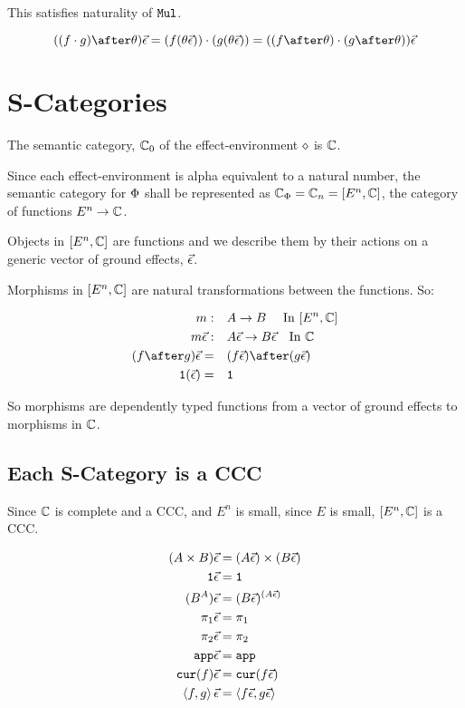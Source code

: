 \documentclass{report}
\begin{document}
This satisfies naturality of $\Mul$.

\begin{equation}
    ((f\dot g)\after \theta)\ev = (f(\theta\ev))\dot(g(\theta\ev)) = ((f\after\theta)\dot(g\after\theta))\ev
\end{equation}

\section{S-Categories}
The semantic category, $\C_0$ of the effect-environment $\nil$ is $\C$.

Since each effect-environment is alpha equivalent to a natural number, the semantic category for $\P$ shall be represented as $\C_{\P} = \C_n = [E^n, \C]$, the category of functions $E^n\rightarrow \C$.

Objects in $[E^n, \C]$ are functions and we describe them by their actions on a generic vector of ground effects, $\ev$.

Morphisms in $[E^n, \C]$ are natural transformations between the functions. So:

\begin{align}
    m:\quad&A \rightarrow B \qt{ In $[E^n, \C]$}\\
    m\ev:\quad& A\ev \rightarrow B\ev \qt{In $\C$}\\
    (f\after g)\ev =\quad& (f\ev)\after(g\ev)\\
    \1(\ev) =\quad& \1
\end{align}

So morphisms are dependently typed functions from a vector of ground effects to morphisms in $\C$.
\subsection{Each S-Category is a CCC}
Since $\C$ is complete and a CCC, and $E^n$ is small, since $E$ is small, $[E^n, \C]$ is a CCC.

\begin{align}
    (A\times B)\ev & = (A\ev)\times(B\ev)\\
    \1\ev & = \1\\
    (B^A)\ev &= (B\ev)^{(A\ev)}\\
    \p\ev & = \p\\
    \pp\ev & = \pp\\
    \app\ev & = \app\\
    \cur{f}\ev & = \cur{f\ev}\\
    \pr{f}{g}\ev & = \pr{f\ev}{g\ev}\\
\end{align}
\end{document}
